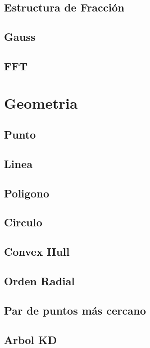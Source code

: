 \documentclass[a4paper,11pt,landscape,twocolumn]{article}
\begin{document}
\subsection{Estructura de Fracción}

\subsection{Gauss}

\subsection{FFT}


\section{Geometria} %
\subsection{Punto}

\subsection{Linea}

\subsection{Poligono}

\subsection{Circulo}

\subsection{Convex Hull}

\subsection{Orden Radial}

\subsection{Par de puntos más cercano}

\subsection{Arbol KD}

\end{document}
